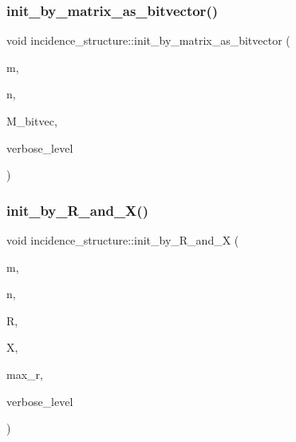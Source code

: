 \subsubsection{\texorpdfstring{init\+\_\+by\+\_\+matrix\+\_\+as\+\_\+bitvector()}{init\_by\_matrix\_as\_bitvector()}}
{\footnotesize\ttfamily void incidence\+\_\+structure\+::init\+\_\+by\+\_\+matrix\+\_\+as\+\_\+bitvector (\begin{DoxyParamCaption}\item[{\mbox{\hyperlink{galois_8h_a09fddde158a3a20bd2dcadb609de11dc}{I\+NT}}}]{m,  }\item[{\mbox{\hyperlink{galois_8h_a09fddde158a3a20bd2dcadb609de11dc}{I\+NT}}}]{n,  }\item[{\mbox{\hyperlink{galois_8h_a122c4acf389c050379f00341fdcd5812}{U\+B\+Y\+TE}} $\ast$}]{M\+\_\+bitvec,  }\item[{\mbox{\hyperlink{galois_8h_a09fddde158a3a20bd2dcadb609de11dc}{I\+NT}}}]{verbose\+\_\+level }\end{DoxyParamCaption})}

\mbox{\label{classincidence__structure_ad06ddc47735dcb98130686512e764085}} 
\subsubsection{\texorpdfstring{init\+\_\+by\+\_\+\+R\+\_\+and\+\_\+\+X()}{init\_by\_R\_and\_X()}}
{\footnotesize\ttfamily void incidence\+\_\+structure\+::init\+\_\+by\+\_\+\+R\+\_\+and\+\_\+X (\begin{DoxyParamCaption}\item[{\mbox{\hyperlink{galois_8h_a09fddde158a3a20bd2dcadb609de11dc}{I\+NT}}}]{m,  }\item[{\mbox{\hyperlink{galois_8h_a09fddde158a3a20bd2dcadb609de11dc}{I\+NT}}}]{n,  }\item[{\mbox{\hyperlink{galois_8h_a09fddde158a3a20bd2dcadb609de11dc}{I\+NT}} $\ast$}]{R,  }\item[{\mbox{\hyperlink{galois_8h_a09fddde158a3a20bd2dcadb609de11dc}{I\+NT}} $\ast$}]{X,  }\item[{\mbox{\hyperlink{galois_8h_a09fddde158a3a20bd2dcadb609de11dc}{I\+NT}}}]{max\+\_\+r,  }\item[{\mbox{\hyperlink{galois_8h_a09fddde158a3a20bd2dcadb609de11dc}{I\+NT}}}]{verbose\+\_\+level }\end{DoxyParamCaption})}

